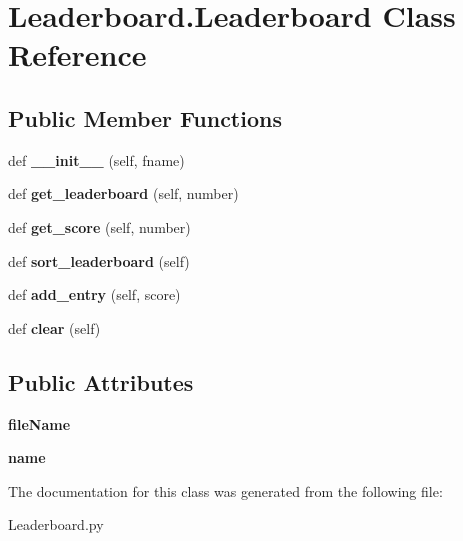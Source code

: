 \hypertarget{class_leaderboard_1_1_leaderboard}{}\section{Leaderboard.\+Leaderboard Class Reference}
\label{class_leaderboard_1_1_leaderboard}
\subsection*{Public Member Functions}
\begin{DoxyCompactItemize}
\item 
\mbox{\label{class_leaderboard_1_1_leaderboard_affaf4d66aef087946bdd8807bf7f5179}} 
def {\bfseries \+\_\+\+\_\+init\+\_\+\+\_\+} (self, fname)
\item 
\mbox{\label{class_leaderboard_1_1_leaderboard_a3e17718a0ee4803bce571e3577fa75de}} 
def {\bfseries get\+\_\+leaderboard} (self, number)
\item 
\mbox{\label{class_leaderboard_1_1_leaderboard_aa1a10cb11235dc6ba207e0cff6586906}} 
def {\bfseries get\+\_\+score} (self, number)
\item 
\mbox{\label{class_leaderboard_1_1_leaderboard_a5d275657e02abc778198a8c4aa6f4304}} 
def {\bfseries sort\+\_\+leaderboard} (self)
\item 
\mbox{\label{class_leaderboard_1_1_leaderboard_a5843c7b6939076a386b2636f85e6596c}} 
def {\bfseries add\+\_\+entry} (self, score)
\item 
\mbox{\label{class_leaderboard_1_1_leaderboard_a0e63ac70057d6e900598b04492b3634c}} 
def {\bfseries clear} (self)
\end{DoxyCompactItemize}
\subsection*{Public Attributes}
\begin{DoxyCompactItemize}
\item 
\mbox{\label{class_leaderboard_1_1_leaderboard_afe984283cfd21ebd9aac63a6a66c2f94}} 
{\bfseries file\+Name}
\item 
\mbox{\label{class_leaderboard_1_1_leaderboard_af4f737f3c0e647c287ecbcf88722d908}} 
{\bfseries name}
\end{DoxyCompactItemize}


The documentation for this class was generated from the following file\+:\begin{DoxyCompactItemize}
\item 
Leaderboard.\+py\end{DoxyCompactItemize}
